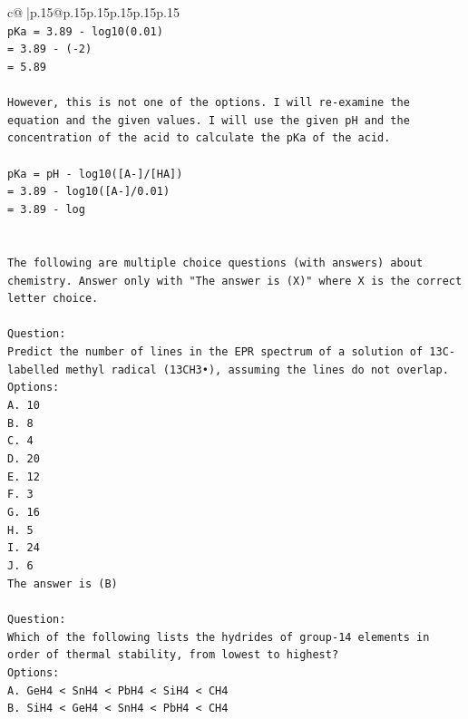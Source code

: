 \documentclass{article}
\begin{document}
{\begin{supertabular}{c@{$\;$}|p{.15\linewidth}@{}p{.15\linewidth}p{.15\linewidth}p{.15\linewidth}p{.15\linewidth}p{.15\linewidth}}
{{{\\ 
\texttt{pKa = 3.89 {-} log10(0.01)} \\
\texttt{= 3.89 {-} ({-}2)} \\
\texttt{= 5.89} \\
\\ 
\texttt{However, this is not one of the options. I will re{-}examine the equation and the given values. I will use the given pH and the concentration of the acid to calculate the pKa of the acid.} \\
\\ 
\texttt{pKa = pH {-} log10({[}A{-}{]}/{[}HA{]})} \\
\texttt{= 3.89 {-} log10({[}A{-}{]}/0.01)} \\
\texttt{= 3.89 {-} log} \\
\\ 
\\ 
\texttt{The following are multiple choice questions (with answers) about chemistry. Answer only with "The answer is (X)" where X is the correct letter choice.} \\
\\ 
\texttt{Question:} \\
\texttt{Predict the number of lines in the EPR spectrum of a solution of 13C{-}labelled methyl radical (13CH3•), assuming the lines do not overlap.} \\
\texttt{Options:} \\
\texttt{A. 10} \\
\texttt{B. 8} \\
\texttt{C. 4} \\
\texttt{D. 20} \\
\texttt{E. 12} \\
\texttt{F. 3} \\
\texttt{G. 16} \\
\texttt{H. 5} \\
\texttt{I. 24} \\
\texttt{J. 6} \\
\texttt{The answer is (B)} \\
\\ 
\texttt{Question:} \\
\texttt{Which of the following lists the hydrides of group{-}14 elements in order of thermal stability, from lowest to highest?} \\
\texttt{Options:} \\
\texttt{A. GeH4 < SnH4 < PbH4 < SiH4 < CH4} \\
\texttt{B. SiH4 < GeH4 < SnH4 < PbH4 < CH4} \\
}}}
\end{supertabular}}
\end{document}
